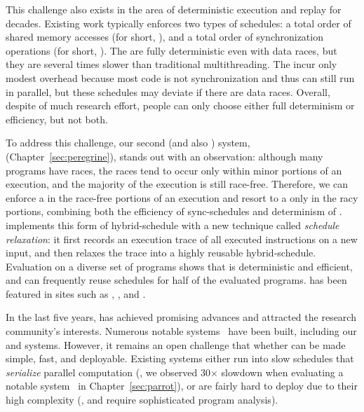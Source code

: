  This challenge also exists in the area of deterministic
execution and replay for decades. Existing work typically enforces two types of
schedules: a total order of shared memory accesses (for short, \memsched), and a
total order of synchronization operations (for short, \syncsched). The
\memscheds are fully deterministic even with data races, but they are several
times slower than traditional multithreading. The \syncscheds incur only modest
overhead because most code is not synchronization and thus can still run in
parallel, but these schedules may deviate if there are data races. Overall,
despite of much research effort, people can only choose either full determinism 
or
efficiency, but not both.

To address this challenge, our second \smt (and also \dmt) system,
\peregrine (Chapter~\ref{sec:peregrine}), stands out
with an observation: although many programs have races, the races tend to occur
only within minor portions of an execution, and the majority of the execution is
still race-free. Therefore, we can enforce a \syncsched in the race-free
portions of an execution and resort to a \memsched only in the racy portions,
combining both the efficiency of sync-schedules and determinism of \memscheds. 
\peregrine implements this form of hybrid-schedule with a new technique called
\emph{schedule relaxation}: it first records an execution trace of
all executed instructions on a new input, and then relaxes the trace into a
highly reusable hybrid-schedule. Evaluation on a diverse set of programs shows
that \peregrine is deterministic and efficient, and can frequently reuse
schedules for half of the evaluated programs. \peregrine has been featured in
sites such as \acmtechnews, \tgdaily, and \physorg.

 In the last
five years, \smt has achieved promising advances and attracted the research
community's interests. Numerous notable \smt systems~\cite{determinator:osdi10,
cui:tern:osdi10, peregrine:sosp11, dthreads:sosp11, bergan:oopsla13} have been
built, including our \tern and \peregrine systems. However, it remains an open
challenge that whether \smt can be made simple, fast, and deployable. Existing 
\smt systems either run into slow schedules that \emph{serialize} parallel
computation (\eg, we observed 30$\times$ slowdown when evaluating a notable 
system~\cite{dthreads:sosp11} in Chapter~\ref{sec:parrot}), or are fairly hard 
to deploy due to their high complexity (\eg, \tern and \peregrine require 
sophisticated program analysis).


